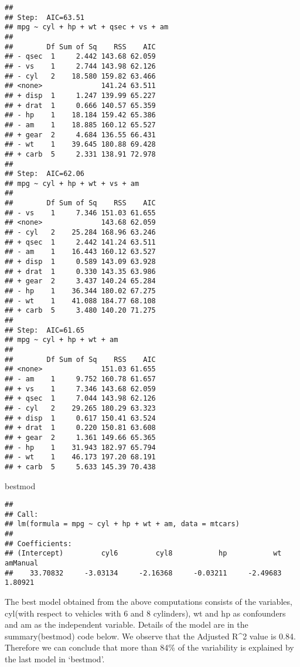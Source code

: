 \documentclass[
]{article}
\newenvironment{Shaded}{\begin{snugshade}}{\end{snugshade}}
\newcommand{\NormalTok}[1]{#1}
\begin{document}
\begin{verbatim}
## 
## Step:  AIC=63.51
## mpg ~ cyl + hp + wt + qsec + vs + am
## 
##        Df Sum of Sq    RSS    AIC
## - qsec  1     2.442 143.68 62.059
## - vs    1     2.744 143.98 62.126
## - cyl   2    18.580 159.82 63.466
## <none>              141.24 63.511
## + disp  1     1.247 139.99 65.227
## + drat  1     0.666 140.57 65.359
## - hp    1    18.184 159.42 65.386
## - am    1    18.885 160.12 65.527
## + gear  2     4.684 136.55 66.431
## - wt    1    39.645 180.88 69.428
## + carb  5     2.331 138.91 72.978
## 
## Step:  AIC=62.06
## mpg ~ cyl + hp + wt + vs + am
## 
##        Df Sum of Sq    RSS    AIC
## - vs    1     7.346 151.03 61.655
## <none>              143.68 62.059
## - cyl   2    25.284 168.96 63.246
## + qsec  1     2.442 141.24 63.511
## - am    1    16.443 160.12 63.527
## + disp  1     0.589 143.09 63.928
## + drat  1     0.330 143.35 63.986
## + gear  2     3.437 140.24 65.284
## - hp    1    36.344 180.02 67.275
## - wt    1    41.088 184.77 68.108
## + carb  5     3.480 140.20 71.275
## 
## Step:  AIC=61.65
## mpg ~ cyl + hp + wt + am
## 
##        Df Sum of Sq    RSS    AIC
## <none>              151.03 61.655
## - am    1     9.752 160.78 61.657
## + vs    1     7.346 143.68 62.059
## + qsec  1     7.044 143.98 62.126
## - cyl   2    29.265 180.29 63.323
## + disp  1     0.617 150.41 63.524
## + drat  1     0.220 150.81 63.608
## + gear  2     1.361 149.66 65.365
## - hp    1    31.943 182.97 65.794
## - wt    1    46.173 197.20 68.191
## + carb  5     5.633 145.39 70.438
\end{verbatim}

\begin{Shaded}
\begin{Highlighting}[]
\NormalTok{bestmod}
\end{Highlighting}
\end{Shaded}

\begin{verbatim}
## 
## Call:
## lm(formula = mpg ~ cyl + hp + wt + am, data = mtcars)
## 
## Coefficients:
## (Intercept)         cyl6         cyl8           hp           wt     amManual  
##    33.70832     -3.03134     -2.16368     -0.03211     -2.49683      1.80921
\end{verbatim}

The best model obtained from the above computations consists of the
variables, cyl(with respect to vehicles with 6 and 8 cylinders), wt and
hp as confounders and am as the independent variable. Details of the
model are in the summary(bestmod) code below. We observe that the
Adjusted R\^{}2 value is 0.84. Therefore we can conclude that more than
84\% of the variability is explained by the last model in `bestmod'.
\end{document}

